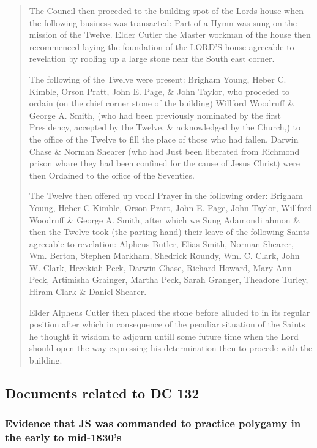 \begin{quote}
			The Council then proceded to the building spot of the Lords house when the following business was transacted: Part of a Hymn was sung on the mission of the Twelve. Elder Cutler the Master workman of the house then recommenced laying the foundation of the LORD'S house agreeable to revelation by rooling up a large stone near the South east corner.
			
			The following of the Twelve were present: Brigham Young, Heber C. Kimble, Orson Pratt, John E. Page, \& John Taylor, who proceded to ordain (on the chief corner stone of the building) Willford Woodruff \& George A. Smith, (who had been previously nominated by the first Presidency, accepted by the Twelve, \& acknowledged by the Church,) to the office of the Twelve to fill the place of those who had fallen. Darwin Chase \& Norman Shearer (who had Just been liberated from Richmond prison whare they had been confined for the cause of Jesus Christ) were then Ordained to the office of the Seventies.
			
			The Twelve then offered up vocal Prayer in the following order: Brigham Young, Heber C Kimble, Orson Pratt, John E. Page, John Taylor, Willford Woodruff \& George A. Smith, after which we Sung Adamondi ahmon \& then the Twelve took (the parting hand) their leave of the following Saints agreeable to revelation: Alpheus Butler, Elias Smith, Norman Shearer, Wm. Berton, Stephen Markham, Shedrick Roundy, Wm. C. Clark, John W. Clark, Hezekiah Peck, Darwin Chase, Richard Howard, Mary Ann Peck, Artimisha Grainger, Martha Peck, Sarah Granger, Theadore Turley, Hiram Clark \& Daniel Shearer.
			
			Elder Alpheus Cutler then placed the stone before alluded to in its regular position after which in consequence of the peculiar situation of the Saints he thought it wisdom to adjourn untill some future time when the Lord should open the way expressing his determination then to procede with the building.
		\end{quote}
		
	\subsection{Documents related to DC 132}
		\label{EXSS-DC132}
		
		\subsubsection{Evidence that JS was commanded to practice polygamy in the early to mid-1830's}
		
